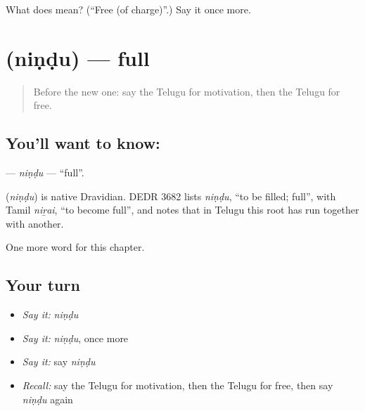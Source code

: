 \begin{tcolorbox}[breakable,colback=teal!4,colframe=teal!35!black,title={Before you move on}]
What does  mean? (\textquotedblleft{}Free (of charge)\textquotedblright{}.) Say it once more.
\end{tcolorbox}
\section[\texorpdfstring{\te{నిండు} (niṇḍu)}{నిండు (niṇḍu)}]{ (niṇḍu) — full}

\label{lesson:TE-C220-nindu}



\begin{quote}
Before the new one: say the Telugu for motivation, then the Telugu for free.
\end{quote}

\subsection*{You'll want to know: }
\textbf{} — \emph{niṇḍu} — \textquotedblleft{}full\textquotedblright{}.

\begin{cousinweb}
\textbf{} (\emph{niṇḍu}) is native Dravidian. DEDR 3682 lists \emph{niṇḍu}, \textquotedblleft{}to be filled; full\textquotedblright{}, with Tamil \emph{niṟai}, \textquotedblleft{}to become full\textquotedblright{}, and notes that in Telugu this root has run together with another.
\end{cousinweb}

\begin{grammarlens}[title={What you've built}]
One more word for this chapter.
\end{grammarlens}

\subsection*{Your turn}
\begin{itemize}
\raggedright
  \item \emph{Say it:} \emph{niṇḍu}
  \item \emph{Say it:} \emph{niṇḍu}, once more
  \item \emph{Say it:} say \emph{niṇḍu}
  \item \emph{Recall:} say the Telugu for motivation, then the Telugu for free, then say \emph{niṇḍu} again
\end{itemize}

